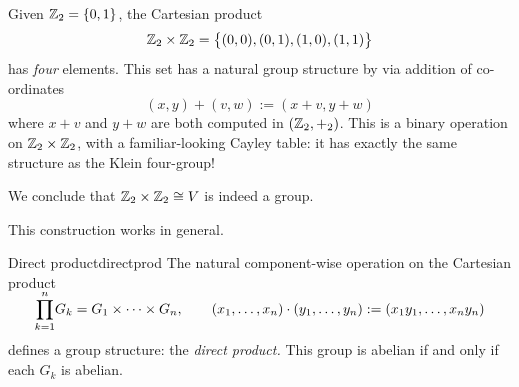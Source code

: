 \begin{example}{}{}
	Given $\mathbb{Z}_2=\{0,1\}$, the Cartesian product
	\[
		\mathbb{Z}_2\times \mathbb{Z}_2=\bigl\{(0,0),(0,1),(1,0),(1,1)\bigr\}
	\]
	has \emph{four} elements. This set has a natural group structure by via addition of co-ordinates
	\[
		(x,y)+(v,w):=(x+v,y+w)
	\]
	where $x+v$ and $y+w$ are both computed in $(\mathbb{Z}_2,+_2)$. This is a binary operation on $\mathbb{Z}_2\times\mathbb{Z}_2$, with a familiar-looking Cayley table: it has exactly the same structure as the Klein four-group!
	\begin{quote}
		\qquad\scalebox{1.5}{$\leftrightsquigarrow$}\qquad
	\end{quote}
	We conclude that $\mathbb{Z}_2\times\mathbb{Z}_2\cong V$ is indeed a group.
\end{example}


This construction works in general.

\begin{thm}{Direct product}{directprod}
	The natural component-wise operation on the Cartesian product
	\[
		\smash[t]{\prod\limits_{k=1}^n} G_k=G_1\times\cdots\times G_n,\qquad (x_1,\ldots,x_n)\cdot(y_1,\ldots,y_n):=(x_1y_1,\ldots,x_ny_n)
	\]
	defines a group structure: the \emph{direct product.} This group is abelian if and only if each $G_k$ is abelian.
\end{thm}

